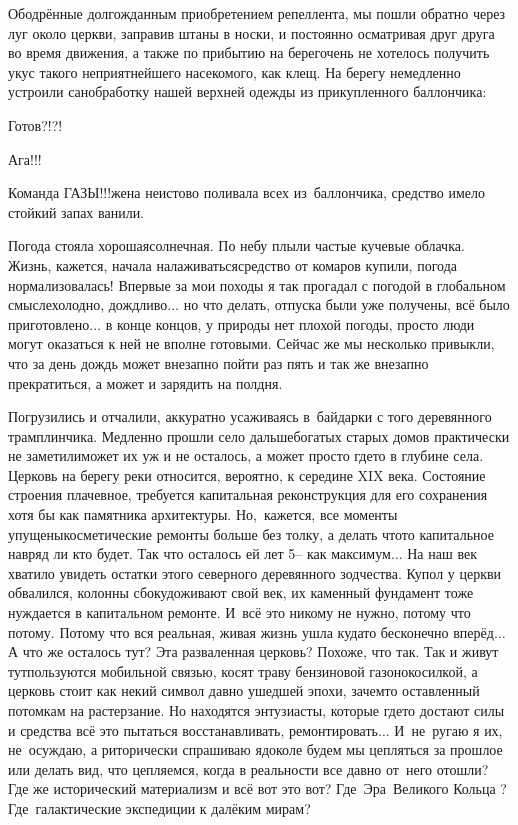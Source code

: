 Ободрённые долгожданным приобретением репеллента, мы пошли обратно через луг около церкви, заправив штаны в носки, и постоянно осматривая друг друга во время движения, а также по прибытию на берег\mdash очень не хотелось получить укус такого неприятнейшего насекомого, как клещ. На берегу немедленно устроили санобработку нашей верхней одежды из прикупленного баллончика:

\diagdash Готов?!?!

\diagdash Ага!!!

\diagdash Команда ГАЗЫ!!!\mdash жена неистово поливала всех из~баллончика, средство имело стойкий запах ванили.

Погода стояла хорошая\mdash солнечная. По небу плыли частые кучевые облачка. Жизнь, кажется, начала налаживаться\mdash средство от комаров купили, погода нормализовалась! Впервые за мои походы я так прогадал с погодой в глобальном смысле\mdash холодно, дождливо$\ldots$ но что делать, отпуска были уже получены, всё было приготовлено$\ldots$ в конце концов, у природы нет плохой погоды, просто люди могут оказаться к ней не вполне готовыми. Сейчас же мы несколько привыкли, что за день дождь может внезапно пойти раз пять и так же внезапно прекратиться, а может и зарядить на полдня. 

Погрузились и отчалили, аккуратно усаживаясь в~байдарки с того деревянного трамплинчика. Медленно прошли село дальше\mdash богатых старых домов практически не заметили\mdash может их уж и не осталось, а может просто где\sdash то в глубине села. Церковь на берегу реки относится, вероятно, к середине XIX века. Состояние строения плачевное, требуется капитальная реконструкция для его сохранения хотя бы как памятника архитектуры. Но,~кажется, все моменты упущены\mdash косметические ремонты больше без толку, а делать что\sdash то капитальное навряд ли кто будет. Так что осталось ей лет 5\thinspace\nobreakdash-- как максимум$\ldots$ На наш век хватило увидеть остатки этого северного деревянного зодчества. Купол у церкви обвалился, колонны сбоку\mdash доживают свой век, их каменный фундамент тоже нуждается в капитальном ремонте. И~всё это никому не нужно, потому что потому. Потому что вся реальная, живая жизнь ушла куда\sdash то бесконечно вперёд$\ldots$ А что же осталось тут? Эта разваленная церковь? Похоже, что так. Так и живут тут\mdash пользуются мобильной связью, косят траву бензиновой газонокосилкой, а церковь стоит как некий символ давно ушедшей эпохи, зачем\sdash то оставленный потомкам на растерзание. Но находятся энтузиасты, которые где\sdash то достают силы и средства всё это пытаться восстанавливать, ремонтировать$\ldots$ И~не~ругаю я их, не~осуждаю, а риторически спрашиваю я\mdash доколе будем мы цепляться за прошлое или делать вид, что цепляемся, когда в реальности все давно от~него отошли? Где же исторический материализм и всё вот это вот? Где~Эра~Великого Кольца \cite{ТуманностьАндромеды}? Где~галактические экспедиции к далёким мирам?

